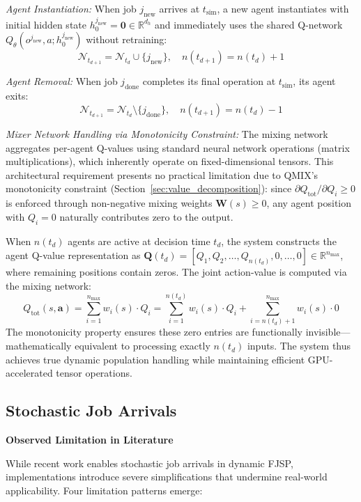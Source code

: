 \textit{Agent Instantiation:} When job \( j_{\text{new}} \) arrives at \( t_{\text{sim}} \), a new agent instantiates with initial hidden state \( h_0^{j_{\text{new}}} = \mathbf{0} \in \mathbb{R}^{d_h} \) and immediately uses the shared Q-network \( Q_{\theta}(o^{j_{\text{new}}}, a; h_0^{j_{\text{new}}}) \) without retraining:
\[
\mathcal{N}_{t_{d+1}} = \mathcal{N}_{t_d} \cup \{j_{\text{new}}\}, \quad n(t_{d+1}) = n(t_d) + 1
\]

\textit{Agent Removal:} When job \( j_{\text{done}} \) completes its final operation at \( t_{\text{sim}} \), its agent exits:
\[
\mathcal{N}_{t_{d+1}} = \mathcal{N}_{t_d} \setminus \{j_{\text{done}}\}, \quad n(t_{d+1}) = n(t_d) - 1
\]

\textit{Mixer Network Handling via Monotonicity Constraint:} The mixing network aggregates per-agent Q-values using standard neural network operations (matrix multiplications), which inherently operate on fixed-dimensional tensors. This architectural requirement presents no practical limitation due to QMIX's monotonicity constraint (Section~\ref{sec:value_decomposition}): since \( \partial Q_{\text{tot}}/\partial Q_i \geq 0 \) is enforced through non-negative mixing weights \( \mathbf{W}(s) \geq 0 \), any agent position with \( Q_i = 0 \) naturally contributes zero to the output.

When \( n(t_d) \) agents are active at decision time \( t_d \), the system constructs the agent Q-value representation as \( \mathbf{Q}(t_d) = [Q_1, Q_2, \ldots, Q_{n(t_d)}, 0, \ldots, 0] \in \mathbb{R}^{n_{\max}} \), where remaining positions contain zeros. The joint action-value is computed via the mixing network:
\[
Q_{\text{tot}}(s, \mathbf{a}) = \sum_{i=1}^{n_{\max}} w_i(s) \cdot Q_i = \sum_{i=1}^{n(t_d)} w_i(s) \cdot Q_i + \sum_{i=n(t_d)+1}^{n_{\max}} w_i(s) \cdot 0
\]
The monotonicity property ensures these zero entries are functionally invisible—mathematically equivalent to processing exactly \( n(t_d) \) inputs. The system thus achieves true dynamic population handling while maintaining efficient GPU-accelerated tensor operations.


\subsection{Stochastic Job Arrivals}
\label{sec:stochastic_adaptation}

\textbf{Observed Limitation in Literature}

While recent work enables stochastic job arrivals in dynamic FJSP, implementations introduce severe simplifications that undermine real-world applicability. Four limitation patterns emerge:

